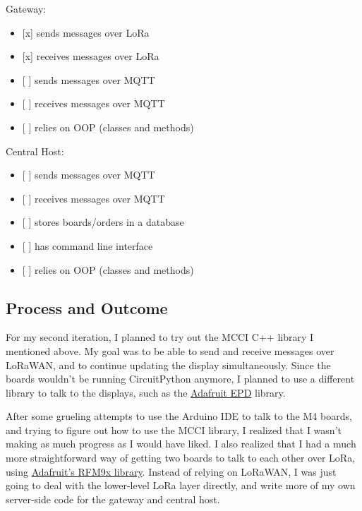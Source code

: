 \documentclass{article}
\begin{document}
\noindent
Gateway:

\begin{itemize}
\item
  {[}x{]} sends messages over LoRa
\item
  {[}x{]} receives messages over LoRa
\item
  {[} {]} sends messages over MQTT
\item
  {[} {]} receives messages over MQTT
\item
  {[} {]} relies on OOP (classes and methods)
\end{itemize}

\noindent
Central Host:

\begin{itemize}
\item
  {[} {]} sends messages over MQTT
\item
  {[} {]} receives messages over MQTT
\item
  {[} {]} stores boards/orders in a database
\item
  {[} {]} has command line interface
\item
  {[} {]} relies on OOP (classes and methods)
\end{itemize}

\subsection{Process and Outcome}\label{process-and-outcome-1}

For my second iteration, I planned to try out the MCCI C++ library I
mentioned above. My goal was to be able to send and receive messages
over LoRaWAN, and to continue updating the display simultaneously. Since
the boards wouldn't be running CircuitPython anymore, I planned to use a
different library to talk to the displays, such as the
\href{https://github.com/adafruit/Adafruit_EPD}{Adafruit EPD} library.

After some grueling attempts to use the Arduino IDE to talk to the M4
boards, and trying to figure out how to use the MCCI library, I realized
that I wasn't making as much progress as I would have liked. I also
realized that I had a much more straightforward way of getting two
boards to talk to each other over LoRa, using
\href{https://github.com/adafruit/Adafruit_CircuitPython_RFM9x}{Adafruit's
RFM9x library}. Instead of relying on LoRaWAN, I was just going to deal
with the lower-level LoRa layer directly, and write more of my own
server-side code for the gateway and central host.
\end{document}
